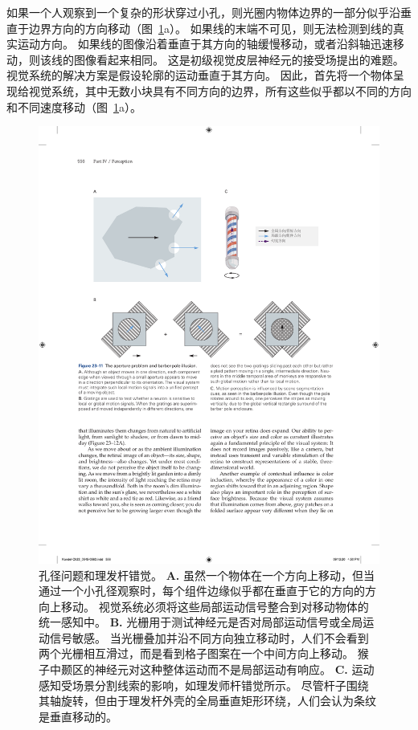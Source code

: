 如果一个人观察到一个复杂的形状穿过小孔，则光圈内物体边界的一部分似乎沿垂直于边界方向的方向移动（图~\ref{fig:23_11}a）。 
如果线的末端不可见，则无法检测到线的真实运动方向。 
如果线的图像沿着垂直于其方向的轴缓慢移动，或者沿斜轴迅速移动，则该线的图像看起来相同。
这是初级视觉皮层神经元的接受场提出的难题。 
视觉系统的解决方案是假设轮廓的运动垂直于其方向。 
因此，首先将一个物体呈现给视觉系统，其中无数小块具有不同方向的边界，所有这些似乎都以不同的方向和不同速度移动（图~\ref{fig:23_11}a）。


\begin{figure}[htbp]
	\centering
	\includegraphics[width=1.0\linewidth]{chap23/fig_23_11}
	\caption{孔径问题和理发杆错觉。
		\textbf{A.} 虽然一个物体在一个方向上移动，但当通过一个小孔径观察时，每个组件边缘似乎都在垂直于它的方向的方向上移动。
		视觉系统必须将这些局部运动信号整合到对移动物体的统一感知中。
		\textbf{B.} 光栅用于测试神经元是否对局部运动信号或全局运动信号敏感。
		当光栅叠加并沿不同方向独立移动时，人们不会看到两个光栅相互滑过，而是看到格子图案在一个中间方向上移动。
		猴子中颞区的神经元对这种整体运动而不是局部运动有响应。
		\textbf{C.} 运动感知受场景分割线索的影响，如理发师杆错觉所示。
		尽管杆子围绕其轴旋转，但由于理发杆外壳的全局垂直矩形环绕，人们会认为条纹是垂直移动的。}
	\label{fig:23_11}
\end{figure}


